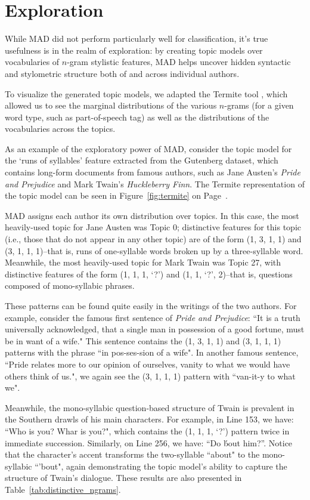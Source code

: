 \documentclass[14pt]{article} %
\theoremstyle{plain}
\theoremstyle{definition}
\theoremstyle{remark}
\begin{document}
\section{Exploration}

While MAD did not perform particularly well for classification, it's true usefulness is in the realm of exploration: by creating topic models over vocabularies of $n$-gram stylistic features, MAD helps uncover hidden syntactic and stylometric structure both of and across individual authors.

To visualize the generated topic models, we adapted the Termite tool \citep{Termite}, which allowed us to see the marginal distributions of the various $n$-grams (for a given word type, such as part-of-speech tag) as well as the distributions of the vocabularies across the topics.

As an example of the exploratory power of MAD, consider the topic model for the `runs of syllables' feature extracted from the Gutenberg dataset, which contains long-form documents from famous authors, such as Jane Austen's \textit{Pride and Prejudice} and Mark Twain's \textit{Huckleberry Finn}. The Termite representation of the topic model can be seen in Figure~\ref{fig:termite} on Page~\pageref{fig:termite}.

MAD assigns each author its own distribution over topics. In this case, the most heavily-used topic for Jane Austen was Topic 0; distinctive features for this topic (i.e., those that do not appear in any other topic) are of the form (1, 3, 1, 1) and (3, 1, 1, 1)--that is, runs of one-syllable words broken up by a three-syllable word. Meanwhile, the most heavily-used topic for Mark Twain was Topic 27, with distinctive features of the form (1, 1, 1, `?') and (1, 1, `?', 2)--that is, questions composed of mono-syllabic phrases.

These patterns can be found quite easily in the writings of the two authors. For example, consider the famous first sentence of \textit{Pride and Prejudice}: ``It is a truth universally acknowledged, that a single man in possession of a good fortune, must be in want of a wife." This sentence contains the (1, 3, 1, 1) and (3, 1, 1, 1) patterns with the phrase ``in pos-ses-sion of a wife". In another famous sentence, ``Pride relates more to our opinion of ourselves, vanity to what we would have others think of us.", we again see the (3, 1, 1, 1) pattern with ``van-it-y to what we".

Meanwhile, the mono-syllabic question-based structure of Twain is prevalent in the Southern drawls of his main characters. For example, in Line 153, we have: ``Who is you? Whar is you?", which contains the (1, 1, 1, `?') pattern twice in immediate succession. Similarly, on Line 256, we have: ``Do \'bout him?''. Notice that the character's accent transforms the two-syllable ``about" to the mono-syllabic ``'bout", again demonstrating the topic model's ability to capture the structure of Twain's dialogue. These results are also presented in Table~\ref{tab:distinctive_ngrams}.
\end{document}
